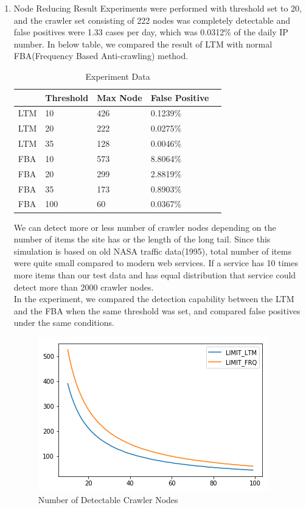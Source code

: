 \documentclass[sigconf,anonymous=true]{acmart}
\begin{document}
\begin{enumerate}
\item Node Reducing Result
\newline 
Experiments were performed with threshold set to 20, and the crawler set consisting of 222 nodes was completely detectable and false positives were 1.33 cases per day, which was 0.0312\% of the daily IP number. In below table, we compared the result of LTM with normal FBA(Frequency Based Anti-crawling) method.

\begin{table}[H]
  \caption{Experiment Data}
    \begin{tabular}{| l | l | l | l | l | }
    \hline
    & Threshold & Max Node & False Positive \\ \hline
    LTM & 10 & 426 & 0.1239\% \\ 
    LTM & 20 & 222 & 0.0275\% \\ 
    LTM & 35 & 128 & 0.0046\% \\ 
    FBA & 10 & 573 & 8.8064\% \\
    FBA & 20 & 299 & 2.8819\% \\ 
    FBA & 35 & 173 & 0.8903\% \\ 
    FBA & 100 & 60 & 0.0367\% \\ \hline
    \end{tabular}
\end{table}

We can detect more or less number of crawler nodes depending on the number of items the site has or the length of the long tail. Since this simulation is based on old NASA traffic data(1995), total number of items were quite small compared to modern web services. If a service has 10 times more items than our test data and has equal distribution that service could detect more than 2000 crawler nodes.\\
In the experiment, we compared the detection capability between the LTM and the FBA when the same threshold was set, and compared false positives under the same conditions.

\begin{figure}[H]
    \centering
    \includegraphics[width=0.85\columnwidth]{figs/figure_limit_compare.png}
    \caption{Number of Detectable Crawler Nodes}
    \label{fig:my_label}
\end{figure}


\end{enumerate}
\end{document}
